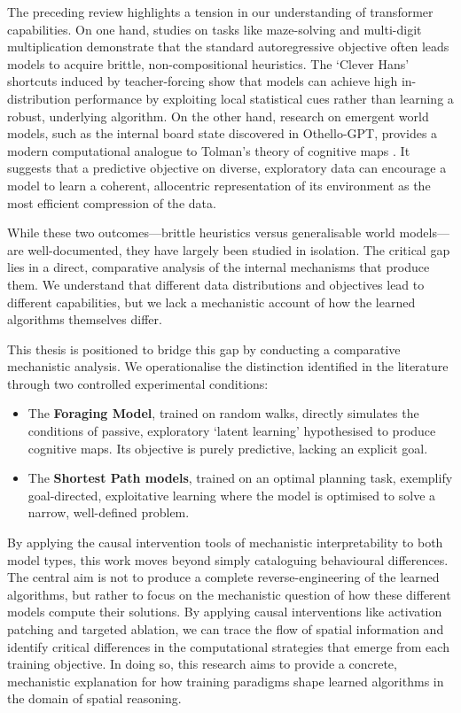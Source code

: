 The preceding review highlights a tension in our understanding of transformer capabilities. On one hand, studies on tasks like maze-solving and multi-digit multiplication demonstrate that the standard autoregressive objective often leads models to acquire brittle, non-compositional heuristics. The `Clever Hans' shortcuts induced by teacher-forcing show that models can achieve high in-distribution performance by exploiting local statistical cues rather than learning a robust, underlying algorithm. On the other hand, research on emergent world models, such as the internal board state discovered in Othello-GPT, provides a modern computational analogue to Tolman's theory of cognitive maps \citep{tolman1948cognitive, li2024emergentworldrepresentationsexploring}. It suggests that a predictive objective on diverse, exploratory data can encourage a model to learn a coherent, allocentric representation of its environment as the most efficient compression of the data.

While these two outcomes—brittle heuristics versus generalisable world models—are well-documented, they have largely been studied in isolation. The critical gap lies in a direct, comparative analysis of the internal mechanisms that produce them. We understand that different data distributions and objectives lead to different capabilities, but we lack a mechanistic account of how the learned algorithms themselves differ.

This thesis is positioned to bridge this gap by conducting a comparative mechanistic analysis. We operationalise the distinction identified in the literature through two controlled experimental conditions:

\begin{itemize}
\item The \textbf{Foraging Model}, trained on random walks, directly simulates the conditions of passive, exploratory `latent learning' hypothesised to produce cognitive maps. Its objective is purely predictive, lacking an explicit goal.
\item The \textbf{Shortest Path models}, trained on an optimal planning task, exemplify goal-directed, exploitative learning where the model is optimised to solve a narrow, well-defined problem.
\end{itemize}

By applying the causal intervention tools of mechanistic interpretability to both model types, this work moves beyond simply cataloguing behavioural differences. The central aim is not to produce a complete reverse-engineering of the learned algorithms, but rather to focus on the mechanistic question of how these different models compute their solutions. By applying causal interventions like activation patching and targeted ablation, we can trace the flow of spatial information and identify critical differences in the computational strategies that emerge from each training objective. In doing so, this research aims to provide a concrete, mechanistic explanation for how training paradigms shape learned algorithms in the domain of spatial reasoning.
